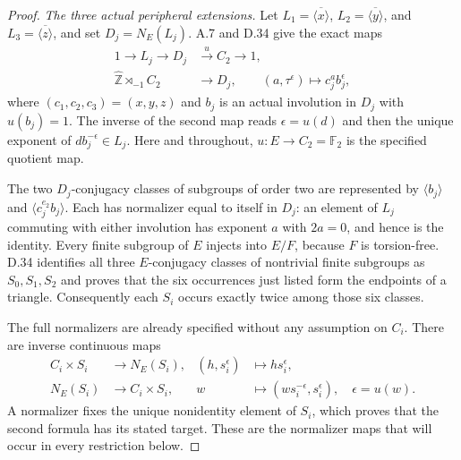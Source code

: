 \begin{proof}
\emph{The three actual peripheral extensions.}
Let $L_1=\overline{\langle x\rangle}$,
$L_2=\overline{\langle y\rangle}$, and
$L_3=\overline{\langle z\rangle}$, and set
$D_j=N_E(L_j)$.  A.7 and D.34 give the exact maps
\[
 \begin{split}
 1\longrightarrow L_j\longrightarrow D_j
       &\xrightarrow{\ u\ }C_2\longrightarrow1,\\
 \widehat{\mathbb Z}\rtimes_{-1}C_2
       &\longrightarrow D_j,\qquad
       (a,\tau^\epsilon)\longmapsto c_j^a b_j^\epsilon ,
 \end{split}
 \tag{D.74.4}
\]
where $(c_1,c_2,c_3)=(x,y,z)$ and $b_j$ is an actual
involution in $D_j$ with $u(b_j)=1$.
The inverse of the second map reads $\epsilon=u(d)$ and
then the unique exponent of $d b_j^{-\epsilon}\in L_j$.
Here and throughout, $u:E\to C_2=\mathbb F_2$ is the
specified quotient map.

The two $D_j$-conjugacy classes of subgroups of order two
are represented by $\langle b_j\rangle$ and
$\langle c_j^{e_2}b_j\rangle$.  Each has normalizer
equal to itself in $D_j$: an element of $L_j$ commuting
with either involution has exponent $a$ with $2a=0$,
and hence is the identity.
Every finite subgroup of $E$ injects into $E/F$, because
$F$ is torsion-free.  D.34 identifies all three
$E$-conjugacy classes of nontrivial finite subgroups as
$S_0,S_1,S_2$ and proves that the six occurrences just
listed form the endpoints of a triangle.  Consequently
each $S_i$ occurs exactly twice among those six classes.

The full normalizers are already specified without any
assumption on $C_i$.  There are inverse continuous maps
\[
 \begin{aligned}
 C_i\times S_i&\longrightarrow N_E(S_i),
                         &(h,s_i^\epsilon)&\longmapsto hs_i^\epsilon,\\
 N_E(S_i)&\longrightarrow C_i\times S_i,
                         &w&\longmapsto(ws_i^{-\epsilon},s_i^\epsilon),
                         \quad \epsilon=u(w).
 \end{aligned}
 \tag{D.74.5}
\]
A normalizer fixes the unique nonidentity element of
$S_i$, which proves that the second formula has its
stated target.  These are the normalizer maps that will
occur in every restriction below.


\end{proof}
